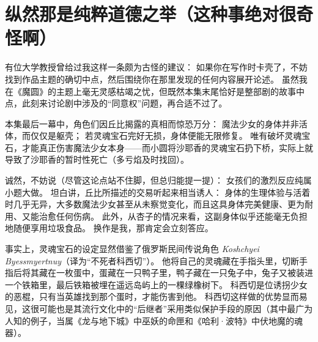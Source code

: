 \chapter[纵然那是纯粹道德之举（这种事绝对很奇怪啊）]{纵然那是纯粹道德之举\protect\footnotemark（这种事绝对很奇怪啊）}


有位大学教授曾给过我这样一条颇为古怪的建议：
如果你在写作时卡壳了，不妨找到作品主题的确切中点，然后围绕你在那里发现的任何内容展开论述。
虽然我在《魔圆》的主题上毫无灵感枯竭之忧，但既然本集末尾恰好是整部剧的故事中点，此刻来讨论剧中涉及的“同意权”问题，再合适不过了。

本集最后一幕中，角色们因丘比揭露的真相而惊恐万分：
魔法少女的身体并非活体，而仅仅是躯壳；
若灵魂宝石完好无损，身体便能无限修复。
唯有破坏灵魂宝石，才能真正伤害魔法少女本身——而小圆将沙耶香的灵魂宝石扔下桥，实际上就导致了沙耶香的暂时性死亡（多亏焰及时找回）。

诚然，不妨说（尽管这论点站不住脚，但总归能提一提）：
女孩们的激烈反应纯属小题大做。
坦白讲，丘比所描述的交易听起来相当诱人：
身体的生理体验与活着时几乎无异，大多数魔法少女甚至从未察觉变化，而且这具身体完美健康、更为耐用、又能治愈任何伤病。
此外，从杏子的情况来看，这副身体似乎还能毫无负担地随便享用垃圾食品。
换作是我，那肯定会立刻答应。

事实上，灵魂宝石的设定显然借鉴了俄罗斯民间传说角色 \emph{Koshchyei Byessmyertnuy}（译为“不死者科西切”）。
他将自己的灵魂藏在手指头里，切断手指后将其藏在一枚蛋中，蛋藏在一只鸭子里，鸭子藏在一只兔子中，兔子又被装进一个铁箱里，最后铁箱被埋在遥远岛屿上的一棵绿橡树下。
科西切是位诱拐少女的恶棍，只有当英雄找到那个蛋时，才能伤害到他\cite{ref34}。
科西切这样做的优势显而易见，这很可能也是其流行文化中的“后继者”采用类似保护手段的原因（其中最广为人知的例子，当属《龙与地下城》\cite{ref35}中巫妖的命匣和《哈利·波特》\cite{ref36}中伏地魔的魂器）。

